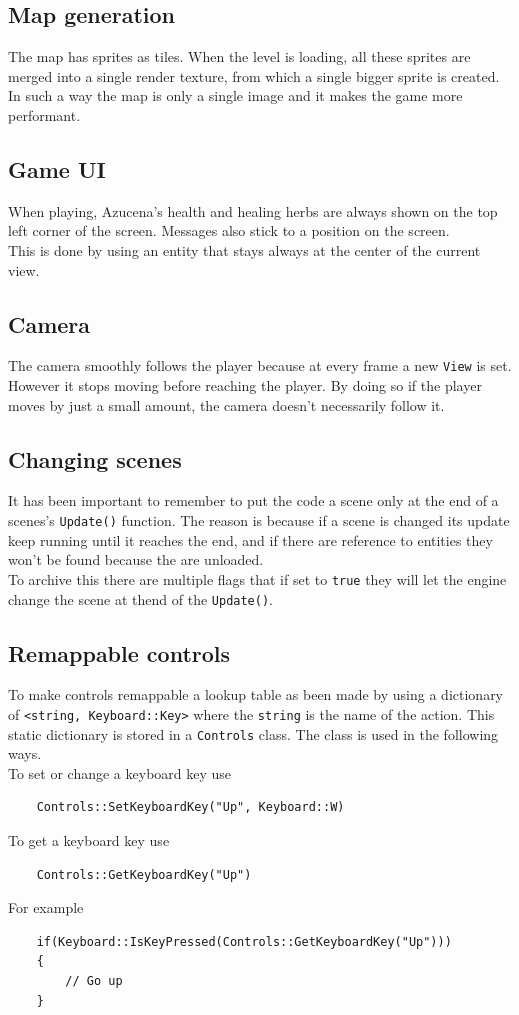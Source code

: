 \documentclass[10pt, a4paper]{article}
\begin{document}
    \subsection{Map generation}
    The map has sprites as tiles. When the level is loading, all these sprites are merged into a single render texture, from which a single bigger sprite is created. In such a way the map is only a single image and it makes the game more performant.
    
    \subsection{Game UI}
    When playing, Azucena’s health and healing herbs are always shown on the top left corner of the screen. Messages also stick to a position on the screen.\\
    This is done by using an entity that stays always at the center of the current view.
    
    \subsection{Camera}
    The camera smoothly follows the player because at every frame a new \texttt{View} is set. However it stops moving before reaching the player. By doing so if the player moves by just a small amount, the camera doesn't necessarily follow it.
    
    \subsection{Changing scenes}
    It has been important to remember to put the code a scene only at the end of a scenes's \texttt{Update()} function. The reason is because if a scene is changed its update keep running until it reaches the end, and if there are reference to entities they won't be found because the are unloaded.\\
    To archive this there are multiple flags that if set to \texttt{true} they will let the engine change the scene at thend of the \texttt{Update()}.
    
    \subsection{Remappable controls}
    To make controls remappable a lookup table as been made by using a dictionary of \texttt{<string, Keyboard::Key>} where the \texttt{string} is the name of the action.
    This static dictionary is stored in a \texttt{Controls} class. The class is used in the following ways.\\
    To set or change a keyboard key use
    \begin{lstlisting}
    Controls::SetKeyboardKey("Up", Keyboard::W)\end{lstlisting}
    To get a keyboard key use
    \begin{lstlisting}
    Controls::GetKeyboardKey("Up")\end{lstlisting}
    For example
    \begin{lstlisting}
    if(Keyboard::IsKeyPressed(Controls::GetKeyboardKey("Up")))
    {
    	// Go up
    }\end{lstlisting}
    
\end{document}
